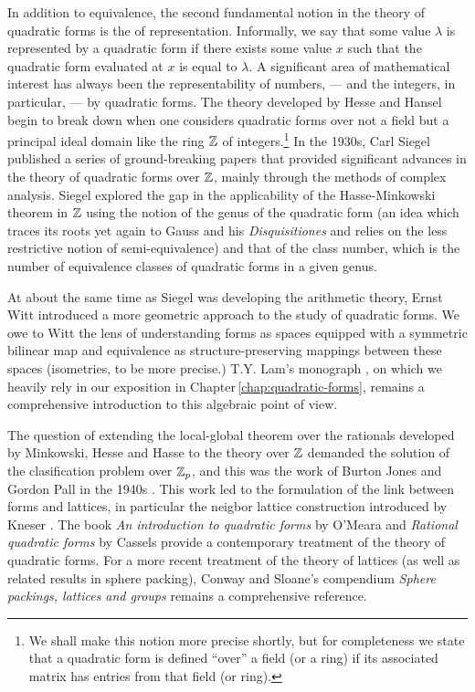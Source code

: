 In addition to equivalence, the second fundamental notion in the theory of
quadratic forms is the of representation. Informally, we say that some value
\(\lambda\) is represented by a quadratic form if there exists some value \(x\)
such that the quadratic form evaluated at \(x\) is equal to \(\lambda\). A
significant area of mathematical interest has always been the representability
of numbers, --- and the integers, in particular, --- by quadratic forms. The
theory developed by Hesse and Hansel begin to break down when one considers
quadratic forms over not a field but a principal ideal domain like the ring
\(\mathbb{Z}\) of integers.\footnote{We shall make this notion more precise
shortly, but for completeness we state that a quadratic form is defined ``over''
a field (or a ring) if its associated matrix has entries from that field (or
ring).} In the 1930s, Carl Siegel published a series of ground-breaking papers
that provided significant advances in the theory of quadratic forms over
\(\mathbb{Z}\), mainly through the methods of complex analysis. Siegel explored
the gap in the applicability of the Hasse-Minkowski theorem in \(\mathbb{Z}\)
using the notion of the genus of the quadratic form (an idea which traces its
roots yet again to Gauss and his \emph{Disquisitiones} and relies on the less
restrictive notion of semi-equivalence) and that of the class number, which is
the number of equivalence classes of quadratic forms in a given genus.
\cite{gerstein2008basic}

At about the same time as Siegel was developing the arithmetic theory, Ernst
Witt introduced a more geometric approach to the study of quadratic forms. We
owe to Witt the lens of understanding forms as spaces equipped with a symmetric
bilinear map and equivalence as structure-preserving mappings between these
spaces (isometries, to be more precise.) T.Y. Lam's monograph
\cite{lam1973quadratic}, on which we heavily rely in our exposition in
Chapter\,\ref{chap:quadratic-forms}, remains a comprehensive introduction to
this algebraic point of view.

The question of extending the local-global theorem over the rationals developed
by Minkowski, Hesse and Hasse to the theory over \(\mathbb{Z}\) demanded the
solution of the clasification problem over \(\mathbb{Z}_p\), and this was the
work of Burton Jones and Gordon Pall in the 1940s \cite{jones1950arithmetic}.
This work led to the formulation of the link between forms and lattices, in
particular the neigbor lattice construction introduced by Kneser
\cite{kneser1954theorie}. The book \emph{An introduction to quadratic forms} by
O'Meara \cite{o2013introduction} and \emph{Rational quadratic forms} by Cassels
\cite{cassels2008rational} provide a contemporary treatment of the theory of
quadratic forms. For a more recent treatment of the theory of lattices (as well
as related results in sphere packing), Conway and Sloane's compendium
\emph{Sphere packings, lattices and groups} \cite{conway1999sphere} remains a
comprehensive reference.

